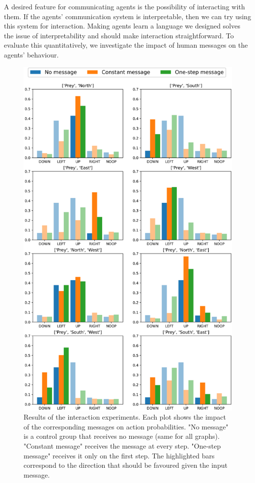 A desired feature for communicating agents is the possibility of interacting with them. If the agents' communication system is interpretable, then we can try using this system for interaction. Making agents learn a language we designed solves the issue of interpretability and should make interaction straightforward. To evaluate this quantitatively, we investigate the impact of human messages on the agents' behaviour. 

\begin{figure}
    \centering
    \includegraphics[width=0.92\linewidth]{Figures/LAMAC/interact.png}
    \caption{Results of the interaction experiments. Each plot shows the impact of the corresponding messages on action probabilities. "No message" is a control group that receives no message (same for all graphs). "Constant message" receives the message at every step. "One-step message" receives it only on the first step. The highlighted bars correspond to the direction that should be favoured given the input message.}
    \label{fig:LAMAC:interact}
\end{figure}

